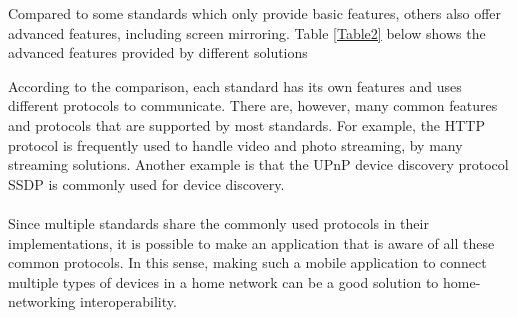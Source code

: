 \begin{enumerate}
Compared to some standards which only provide basic features, others also offer advanced 
features, including screen mirroring. Table \ref{Table2} below shows 
the advanced features provided by different solutions
\begin{table}[htb] 
\caption{Advanced feature comparison \label{Table2}} 
\begin{center} 
\end{center} 
\end{table} 


\end{enumerate} 

According to the comparison, each standard has its own features and uses 
different protocols to communicate. There are, however, many common features and protocols that are supported by most standards. For example, the HTTP protocol is frequently used to handle video 
and photo streaming, by many streaming solutions. Another example is that the UPnP device discovery protocol SSDP is commonly used for device discovery. \\
\\
Since multiple standards share the commonly used protocols in their implementations, it is possible to make an application that is aware of all these common protocols. In this sense, making such a mobile application to connect multiple types of devices in a home network can be a good solution to home-networking interoperability. 